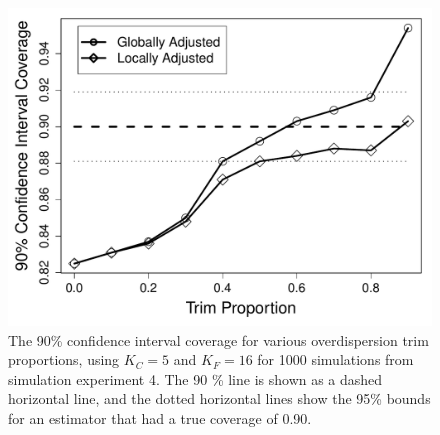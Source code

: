 \documentclass[12pt, titlepage]{article}\usepackage[]{graphicx}\usepackage[]{color}
\makeatletter
\def\maxwidth{ %
  \ifdim\Gin@nat@width>\linewidth
    \linewidth
  \else
    \Gin@nat@width
  \fi
}
\makeatother
\begin{document}
	\begin{figure}[H]
	\begin{center}
	\includegraphics[width = .8\maxwidth]{figure/EffectTrimProp}
	\end{center}
	\caption{The 90\% confidence interval coverage for various overdispersion trim proportions, using $K_C=5$ and $K_F=16$ for 1000 simulations from simulation experiment 4.  The 90 \% line is shown as a dashed horizontal line, and the dotted horizontal lines show the 95\% bounds for an estimator that had a true coverage of 0.90.  \label{EffectTrimProp}}
	\end{figure}

\end{document}
